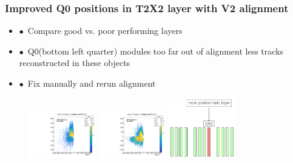 \documentclass[xcolor=dvipsnames, aspectratio=1610, 12pt]{beamer}
\begin{document}
\begin{frame}\frametitle{Improved Q0 positions in T2X2 layer with V2 alignment}
  \begin{itemize}
    \item $\bullet$\, Compare good vs. poor performing layers
    \item $\bullet$\, Q0(bottom left quarter) modules too far out of alignment \to less tracks reconstructed in these objects
    \item $\bullet$\, Fix manually and rerun alignment
  \end{itemize}
  \begin{figure}
    \includegraphics[width=0.26\textwidth]{logos/2D_nodeXY_v2_7_left.pdf}%
    \includegraphics[width=0.26\textwidth]{logos/2D_nodeXY_quartermean_7_left.pdf}%
    \includegraphics[width=0.26\textwidth]{plots/problem_layer.png}%
  \end{figure}
\end{frame}
\end{document}

